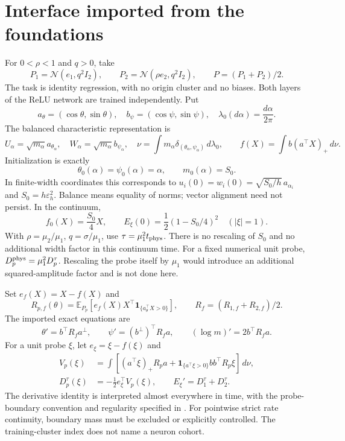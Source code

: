 \documentclass[11pt]{article}
\numberwithin{equation}{section}
\theoremstyle{definition}
\theoremstyle{remark}
\newcommand{\E}{\mathbb E}
\newcommand{\1}{\mathbf 1}
\newcommand{\dd}{\,d}
\begin{document}
\section{Interface imported from the foundations}\label{pa:setup}
For $0<\rho<1$ and $q>0$, take
\begin{equation}\label{pa:data}
 P_1=\mathcal N(e_1,q^2I_2),\qquad
 P_2=\mathcal N(\rho e_2,q^2I_2),\qquad P=(P_1+P_2)/2.
\end{equation}
The task is identity regression, with no origin cluster and no biases.
Both layers of the ReLU network are trained independently. Put
\[
 a_\theta=(\cos\theta,\sin\theta),\quad
 b_\psi=(\cos\psi,\sin\psi),\quad
 \lambda_0(d\alpha)=\frac{d\alpha}{2\pi}.
\]
The balanced characteristic representation is
\begin{equation}\label{pa:representation}
 U_\alpha=\sqrt{m_\alpha}a_{\theta_\alpha},\quad
 W_\alpha=\sqrt{m_\alpha}b_{\psi_\alpha},\quad
 \nu=\int m_\alpha\delta_{(\theta_\alpha,\psi_\alpha)}\dd\lambda_0,
 \qquad f(X)=\int b(a^\top X)_+\dd\nu.
\end{equation}
Initialization is exactly
\begin{equation}\label{pa:init}
 \theta_0(\alpha)=\psi_0(\alpha)=\alpha,\qquad m_0(\alpha)=S_0.
\end{equation}
In finite-width coordinates this corresponds to
$u_i(0)=w_i(0)=\sqrt{S_0/h}\,a_{\alpha_i}$ and
$S_0=h\varepsilon_h^2$. Balance means equality of norms; vector alignment
need not persist. In the continuum,
\[
 f_0(X)=\frac{S_0}{4}X,\qquad E_\xi(0)=\frac12(1-S_0/4)^2
 \quad (|\xi|=1).
\]
With $\rho=\mu_2/\mu_1$, $q=\sigma/\mu_1$, use
$\tau=\mu_1^2t_{\rm phys}$. There is no rescaling of $S_0$ and no additional
width factor in this continuum time. For a fixed numerical unit probe,
$D_p^{\rm phys}=\mu_1^2D_p^\tau$. Rescaling the probe itself by $\mu_1$
would introduce an additional squared-amplitude factor and is not done here.

Set $e_f(X)=X-f(X)$ and
\begin{equation}\label{pa:residualmatrix}
 R_{p,f}(\theta)=\E_{P_p}[e_f(X)X^\top\1_{\{a_\theta^\top X>0\}}],
 \qquad R_f=(R_{1,f}+R_{2,f})/2.
\end{equation}
The imported exact equations are
\begin{equation}\label{pa:exactflow}
 \theta'=b^\top R_fa^\perp,\qquad
 \psi'=(b^\perp)^\top R_fa,\qquad
 (\log m)'=2b^\top R_fa.
\end{equation}
For a unit probe $\xi$, let $e_\xi=\xi-f(\xi)$ and
\begin{align}
 V_p(\xi)&=\int\left[(a^\top\xi)_+R_pa+
 \1_{\{a^\top\xi>0\}}bb^\top R_p\xi\right]\dd\nu,\label{pa:rawvelocity}\\
 D_p^\tau(\xi)&=-\frac12e_\xi^\top V_p(\xi),\qquad
 E_\xi'=D_1^\tau+D_2^\tau.\label{pa:exactrates}
\end{align}
The derivative identity is interpreted almost everywhere in time, with the
probe-boundary convention and regularity specified in \cite{F}. For pointwise
strict rate continuity, boundary mass must be excluded or explicitly controlled.
The training-cluster index does not name a neuron cohort.
\end{document}
